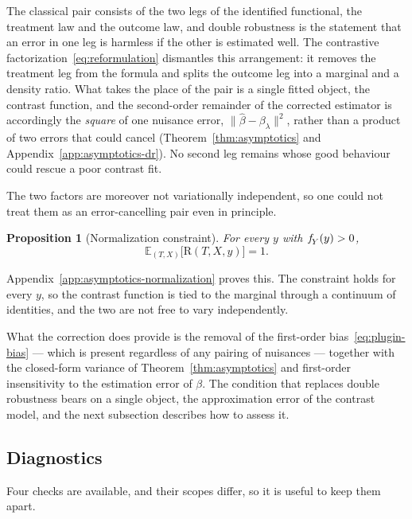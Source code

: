 \documentclass[11pt]{article}
\theoremstyle{plain}
\newtheorem{mypropo}{Proposition}
\theoremstyle{definition}
\theoremstyle{remark}
\newcommand{\pE}{\ensuremath{\mathbb{E}}}
\newcommand{\pf}[1]{\ensuremath{\,\mathlarger{\textit{f}}_{#1}}}
\newcommand{\DensityRatio}{\text{R}}
\newcommand{\betahat}{\widehat{\beta}}
\begin{document}
The classical pair consists of the two legs of the identified functional, the treatment law
and the outcome law, and double robustness is the statement that an error in one leg is
harmless if the other is estimated well. The contrastive factorization~\eqref{eq:reformulation}
dismantles this arrangement: it removes the treatment leg from the formula and splits the outcome
leg into a marginal and a density ratio. What takes the place of the pair is a single fitted
object, the contrast function, and the second-order remainder of the corrected estimator is
accordingly the \emph{square} of one nuisance error, $\|\betahat - \beta_\lambda\|^2$, rather than
a product of two errors that could cancel (Theorem~\ref{thm:asymptotics} and
Appendix~\ref{app:asymptotics-dr}). No second leg remains whose good behaviour could rescue a
poor contrast fit.

The two factors are moreover not variationally independent, so one could not treat them as an
error-cancelling pair even in principle.

\begin{mypropo}[Normalization constraint]
\label{prop:normalization}
For every $y$ with $\pf{Y}(y) > 0$,
\begin{equation}
\pE_{(T,X)}\big[ \DensityRatio(T,X,y) \big] = 1 .
\label{eq:normalization}
\end{equation}
\end{mypropo}

Appendix~\ref{app:asymptotics-normalization} proves this. The constraint holds for every $y$,
so the contrast function is tied to the marginal through a continuum of identities, and the
two are not free to vary independently.

What the correction does provide is the removal of the first-order bias~\eqref{eq:plugin-bias}
--- which is present regardless of any pairing of nuisances --- together with the closed-form
variance of Theorem~\ref{thm:asymptotics} and first-order insensitivity to the estimation
error of $\beta$. The condition that replaces double robustness bears on a single object, the
approximation error of the contrast model, and the next subsection describes how to assess it.

\subsection{Diagnostics}
\label{sec:discussion-diagnostics}

Four checks are available, and their scopes differ, so it is useful to keep them apart.
\end{document}
